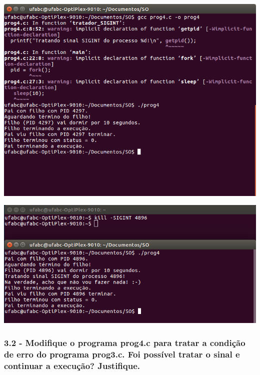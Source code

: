 \vspace{2em}
\begin{minipage}{\textwidth}
    \hspace{-1em}
    \centering
    \begin{minipage}[b]{0.49\textwidth}
        \centering
        \includegraphics[trim=0 110 0 0,clip,scale=.3]{pratica1/prog4.png}
        \label{prog4png}
    \end{minipage}
    \hfill
    \begin{minipage}[b]{0.49\textwidth}
        \centering
        \includegraphics[scale=.3]{pratica1/prog4kill.png}
        \label{prog4killpng}
    \end{minipage}
    \hspace{1em}
\end{minipage}

\subsubsection{3.2 - Modiﬁque o programa prog4.c para tratar a condição de erro do programa prog3.c. Foi possível tratar o sinal e continuar a execução? Justiﬁque.}

